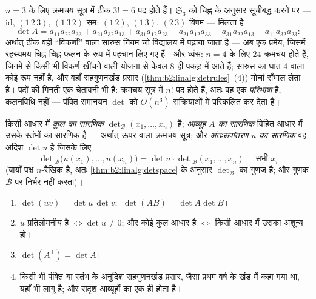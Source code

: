 \begin{example}[सारुस, व्युत्पन्न और ध्वस्त]\label{ex:b2:linalg:sarrus}
$n = 3$ के लिए क्रमचय सूत्र में ठीक $3! = 6$ पद होते हैं। $\mathfrak{S}_3$ को चिह्न के
अनुसार सूचीबद्ध करने पर --- $\mathrm{id}$, $(1\,2\,3)$, $(1\,3\,2)$ सम; $(1\,2)$, $(1\,3)$, $(2\,3)$ विषम ---
मिलता है
\[
\det A = a_{11}a_{22}a_{33} + a_{21}a_{32}a_{13} +
a_{31}a_{12}a_{23}
- a_{21}a_{12}a_{33} - a_{31}a_{22}a_{13} -
a_{11}a_{32}a_{23} :
\]
अर्थात् ठीक वही ``विकर्णों'' वाला सारुस नियम जो विद्यालय में पढ़ाया
जाता है --- अब एक प्रमेय, जिसमें रहस्यमय चिह्न चिह्न-फलन के रूप में
पहचान लिए गए हैं। और ध्वंस: $n = 4$ के लिए $24$ क्रमचय होते हैं, जिनमें
से किसी भी विकर्ण-खींचने वाली योजना से केवल $8$ ही पकड़ में आते हैं;
सारुस का घात-$4$ वाला कोई रूप नहीं है, और वहाँ सहगुणनखंड प्रसार
(\cref{thm:b2:linalg:detrules}~(4)) मोर्चा सँभाल लेता है। पदों की गिनती एक चेतावनी भी है:
क्रमचय सूत्र में $n!$ पद होते हैं, अतः वह एक \emph{परिभाषा} है, कलनविधि
नहीं --- पंक्ति समानयन $\det$ को $O(n^3)$ संक्रियाओं में परिकलित कर देता है।
\end{example}

\begin{definition}[सारणिक]\label{def:b2:linalg:det}
किसी आधार में \emph{कुल का सारणिक} $\det_{\mathcal{B}}(x_1, \dots, x_n)$ है; \emph{आव्यूह
$A$ का सारणिक} विहित आधार में उसके स्तंभों का सारणिक है --- अर्थात्
ऊपर वाला क्रमचय सूत्र; और \emph{अंतःरूपांतरण $u$ का सारणिक} वह अदिश
$\det u$ है जिसके लिए
\[
\det{}_{\mathcal{B}}\bigl(u(x_1), \dots, u(x_n)\bigr)
= \det u \cdot \det{}_{\mathcal{B}}(x_1, \dots, x_n)
\quad \text{ सभी } x_i
\]
(बायाँ पक्ष  $n$-रैखिक है, अतः \cref{thm:b2:linalg:detspace} के अनुसार $\det_\mathcal{B}$ का गुणज है;
और गुणक $\mathcal{B}$ पर निर्भर नहीं करता)।
\end{definition}

\begin{theorem}[सारणिक का कलन, सिद्ध]\label{thm:b2:linalg:detrules}
\begin{enumerate}
  \item $\det(uv) = \det u\,\det v$; $\;\det(AB) = \det A \det B$।
  \item $u$ प्रतिलोमनीय है $\iff \det u \neq 0$; और कोई कुल आधार है $\iff$ किसी आधार में
        उसका  अशून्य हो।
  \item $\det(A^{\mathsf T}) = \det A$।
  \item किसी भी पंक्ति या स्तंभ के अनुदिश सहगुणनखंड प्रसार, जैसा प्रथम
        वर्ष के खंड में कहा गया था, यहाँ भी लागू है; और सदृश आव्यूहों
        का  एक ही होता है।
\end{enumerate}
\end{theorem}

